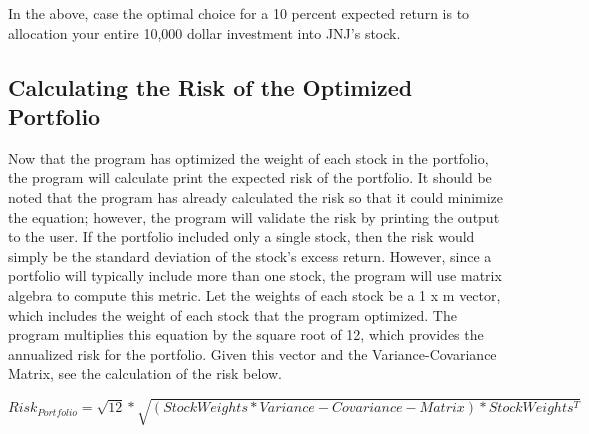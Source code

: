 \documentclass[12pt,english]{article}
\begin{document}
\begin{doublespace}
            \indent{}
            In the above, case the optimal choice for a 10 percent expected return is to allocation your entire 10,000 dollar investment into JNJ’s stock.
                
        \subsection{Calculating the Risk of the Optimized Portfolio}
            
            \indent{}\indent{}
            Now that the program has optimized the weight of each stock in the portfolio, the program will calculate print the expected risk of the portfolio. It should be noted that the program has already calculated the risk so that it could minimize the equation; however, the program will validate the risk by printing the output to the user. If the portfolio included only a single stock, then the risk would simply be the standard deviation of the stock’s excess return. However, since a portfolio will typically include more than one stock, the program will use matrix algebra to compute this metric. Let the weights of each stock be a 1 x m vector, which includes the weight of each stock that the program optimized. The program multiplies this equation by the square root of 12, which provides the annualized risk for the portfolio. Given this vector and the Variance-Covariance Matrix, see the calculation of the risk below.
            
            \end{doublespace}
                \begin{singlespace}
                    \begin{center}
                        \begin{equation} \label{Portfolio Risk}
                            Risk_{Portfolio} = 
                            \sqrt{12} * \sqrt{(StockWeights * Variance-Covariance-Matrix) * StockWeights^{T}}
                        \end{equation}
                    \end{center}
                \end{singlespace}
\end{document}
